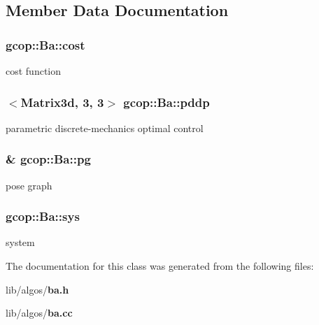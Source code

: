 \subsection{\-Member \-Data \-Documentation}
\subsubsection[{cost}]{ {\bf gcop\-::\-Ba\-::cost}}\label{classgcop_1_1Ba_a445643b4df9b0d6f71f4e370a1e2ee1a}


cost function 

\subsubsection[{pddp}]{$<$\-Matrix3d, 3, 3$>$ {\bf gcop\-::\-Ba\-::pddp}}\label{classgcop_1_1Ba_a4095d9ad19ec8571532430546bb61723}


parametric discrete-\/mechanics optimal control 

\subsubsection[{pg}]{\& {\bf gcop\-::\-Ba\-::pg}}\label{classgcop_1_1Ba_a5f47a3b433dc2110e8a0e069088858c3}


pose graph 

\subsubsection[{sys}]{ {\bf gcop\-::\-Ba\-::sys}}\label{classgcop_1_1Ba_a13187961c03f8d0988d38cb88ed2722d}


system 



\-The documentation for this class was generated from the following files\-:\begin{DoxyCompactItemize}
\item 
lib/algos/{\bf ba.\-h}\item 
lib/algos/{\bf ba.\-cc}\end{DoxyCompactItemize}

